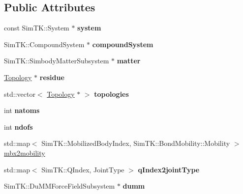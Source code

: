 \subsection*{Public Attributes}
\begin{DoxyCompactItemize}
\item 
const Sim\+T\+K\+::\+System $\ast$ {\bfseries system}\hypertarget{classSampler_a25c66070f64d79e8b94c678b78d0e277}{}\label{classSampler_a25c66070f64d79e8b94c678b78d0e277}

\item 
Sim\+T\+K\+::\+Compound\+System $\ast$ {\bfseries compound\+System}\hypertarget{classSampler_aa9d5f0914ab6868559980ae0a7c3bd62}{}\label{classSampler_aa9d5f0914ab6868559980ae0a7c3bd62}

\item 
Sim\+T\+K\+::\+Simbody\+Matter\+Subsystem $\ast$ {\bfseries matter}\hypertarget{classSampler_a88113c1bcf12b6a11c6274697f6c186b}{}\label{classSampler_a88113c1bcf12b6a11c6274697f6c186b}

\item 
\hyperlink{classTopology}{Topology} $\ast$ {\bfseries residue}\hypertarget{classSampler_ad4577776a8e351803ccdceeeb9cc8f53}{}\label{classSampler_ad4577776a8e351803ccdceeeb9cc8f53}

\item 
std\+::vector$<$ \hyperlink{classTopology}{Topology} $\ast$ $>$ {\bfseries topologies}\hypertarget{classSampler_ac00c89482575d83ad879436effeddebc}{}\label{classSampler_ac00c89482575d83ad879436effeddebc}

\item 
int {\bfseries natoms}\hypertarget{classSampler_adfb71a546356d6e8f65aacb40aa98cfe}{}\label{classSampler_adfb71a546356d6e8f65aacb40aa98cfe}

\item 
int {\bfseries ndofs}\hypertarget{classSampler_ac261eb04d288ae674e9da7fa69e5af54}{}\label{classSampler_ac261eb04d288ae674e9da7fa69e5af54}

\item 
std\+::map$<$ Sim\+T\+K\+::\+Mobilized\+Body\+Index, Sim\+T\+K\+::\+Bond\+Mobility\+::\+Mobility $>$ \hyperlink{classSampler_a795db0c66f3527f447f899f552c30a8b}{mbx2mobility}
\item 
std\+::map$<$ Sim\+T\+K\+::\+Q\+Index, Joint\+Type $>$ {\bfseries q\+Index2joint\+Type}\hypertarget{classSampler_ad6bdd42c05c63d7f1ac17b170fb0745b}{}\label{classSampler_ad6bdd42c05c63d7f1ac17b170fb0745b}

\item 
Sim\+T\+K\+::\+Du\+M\+M\+Force\+Field\+Subsystem $\ast$ {\bfseries dumm}\hypertarget{classSampler_a87dbe61f06ba47644bd77d397fc505a2}{}\label{classSampler_a87dbe61f06ba47644bd77d397fc505a2}


\end{DoxyCompactItemize}
